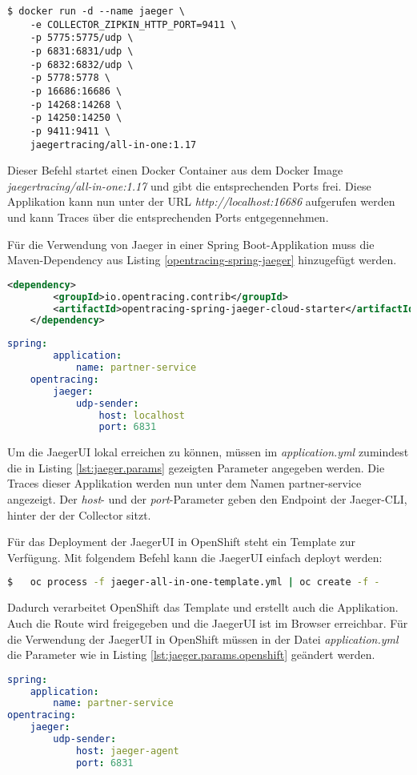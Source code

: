 \begin{lstlisting}
$ docker run -d --name jaeger \
	-e COLLECTOR_ZIPKIN_HTTP_PORT=9411 \
	-p 5775:5775/udp \
	-p 6831:6831/udp \
	-p 6832:6832/udp \
	-p 5778:5778 \
	-p 16686:16686 \
	-p 14268:14268 \
	-p 14250:14250 \
	-p 9411:9411 \
	jaegertracing/all-in-one:1.17
\end{lstlisting}
Dieser Befehl startet einen Docker Container aus dem Docker Image \textit{jaegertracing/all-in-one:1.17} und gibt die entsprechenden Ports frei. Diese Applikation kann nun unter der URL \textit{http://localhost:16686} aufgerufen werden und kann Traces über die entsprechenden Ports entgegennehmen.

Für die Verwendung von Jaeger in einer Spring Boot-Applikation muss die Maven-Dependency aus Listing \ref{opentracing-spring-jaeger} hinzugefügt werden.
\begin{lstlisting}[language=xml, caption=pom.xml, label=opentracing-spring-jaeger]
	<dependency>
		<groupId>io.opentracing.contrib</groupId>
		<artifactId>opentracing-spring-jaeger-cloud-starter</artifactId>
	</dependency>
\end{lstlisting}


\begin{lstlisting}[language=yml, caption=application.yml, label=lst:jaeger.params]
	spring:
		application:
			name: partner-service
	opentracing:
		jaeger:
			udp-sender:
				host: localhost
				port: 6831
\end{lstlisting}

Um die JaegerUI lokal erreichen zu können, müssen im \textit{application.yml} zumindest die in Listing \ref{lst:jaeger.params} gezeigten Parameter angegeben werden. Die Traces dieser Applikation werden nun unter dem Namen \glqq partner-service\grqq{} angezeigt.
Der \textit{host}- und der \textit{port}-Parameter geben den Endpoint der Jaeger-CLI, hinter der der Collector sitzt.

Für das Deployment der JaegerUI in OpenShift steht ein Template zur Verfügung. Mit folgendem Befehl kann die JaegerUI einfach deployt werden:
\begin{lstlisting}[language=bash]
$ 	oc process -f jaeger-all-in-one-template.yml | oc create -f -
\end{lstlisting}

Dadurch verarbeitet OpenShift das Template und erstellt auch die Applikation. Auch die Route wird freigegeben und die JaegerUI ist im Browser erreichbar.
Für die Verwendung der JaegerUI in OpenShift müssen in der Datei \textit{application.yml} die Parameter wie in Listing \ref{lst:jaeger.params.openshift} geändert werden.
\begin{lstlisting}[language=yml, caption=application.yml, label=lst:jaeger.params.openshift]
spring:
	application:
		name: partner-service
opentracing:
	jaeger:
		udp-sender:
			host: jaeger-agent
			port: 6831
\end{lstlisting}

